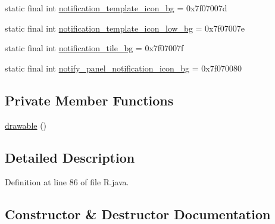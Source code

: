 \begin{DoxyCompactItemize}
\item 
static final int \mbox{\hyperlink{classandroid_1_1support_1_1v7_1_1recyclerview_1_1_r_1_1drawable_a309b0025cdcb1c55708e4b85495cbc89}{notification\+\_\+template\+\_\+icon\+\_\+bg}} = 0x7f07007d
\item 
static final int \mbox{\hyperlink{classandroid_1_1support_1_1v7_1_1recyclerview_1_1_r_1_1drawable_a48c70131cea06dedb4af85e7ec783ed5}{notification\+\_\+template\+\_\+icon\+\_\+low\+\_\+bg}} = 0x7f07007e
\item 
static final int \mbox{\hyperlink{classandroid_1_1support_1_1v7_1_1recyclerview_1_1_r_1_1drawable_ab1a5b89b74498f702bf36c86091b1865}{notification\+\_\+tile\+\_\+bg}} = 0x7f07007f
\item 
static final int \mbox{\hyperlink{classandroid_1_1support_1_1v7_1_1recyclerview_1_1_r_1_1drawable_a74df627da5b232a7f838aa3fa672c043}{notify\+\_\+panel\+\_\+notification\+\_\+icon\+\_\+bg}} = 0x7f070080
\end{DoxyCompactItemize}
\subsection*{Private Member Functions}
\begin{DoxyCompactItemize}
\item 
\mbox{\hyperlink{classandroid_1_1support_1_1v7_1_1recyclerview_1_1_r_1_1drawable_ae8de2eb116e0c0ce51f58798ed5ee7e6}{drawable}} ()
\end{DoxyCompactItemize}


\subsection{Detailed Description}


Definition at line 86 of file R.\+java.



\subsection{Constructor \& Destructor Documentation}
\mbox{\label{classandroid_1_1support_1_1v7_1_1recyclerview_1_1_r_1_1drawable_ae8de2eb116e0c0ce51f58798ed5ee7e6}} 
